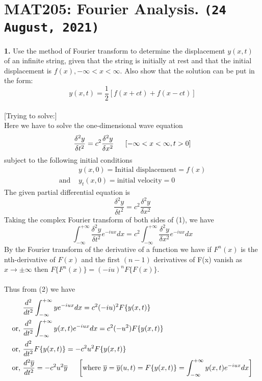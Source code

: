 \documentclass[11pt]{article}
\begin{document}
\section*{MAT205: Fourier Analysis. \texttt{(24 August, 2021)}}
\textbf{1.} Use the method of Fourier transform to determine the displacement $y(x, t)$ of an infinite string, given that the string is initially at rest and that the initial displacement is $f(x), -\infty < x < \infty$. Also show that the solution can be put in the form:
\begin{displaymath}
y(x, t)=\frac{1}{2}\left[f(x+ct)+f(x-ct)\right]
\end{displaymath} \\
\hspace{0cm}
[Trying to solve:]  \\
Here we have to solve the one-dimensional wave equation
$$\frac{\delta^2y}{\delta t^2}=c^2\frac{\delta^2y}{\delta x^2} \hspace{0.5cm}\left[-\infty < x < \infty, t>0\right]$$
subject to the following initial conditions
\begin{align*}
&y(x,0)=\textrm{Initial displacement}=f(x) \\
\textrm{and }&y_t(x,0)=\textrm{initial velocity}=0
\end{align*}
The given partial differential equation is
\begin{equation}
\frac{\delta^2y}{\delta t^2}=c^2\frac{\delta^2y}{\delta x^2}
\end{equation}
Taking the complex Fourier transform of both sides of (1), we have
\begin{equation}
\int_{-\infty}^{+\infty}\frac{\delta^2y}{\delta t^2}e^{-iux} dx=c^2\int_{-\infty}^{+\infty}\frac{\delta^2y}{\delta x^2}e^{-iux} dx
\end{equation}
By the Fourier transform of the derivative of a function we have if $F^n(x)$ is the nth-derivative of $F(x)$ and the first $(n-1)$ derivatives of F(x) vanish as $x \rightarrow \pm \infty$ then $F\{F^n(x)\}=(-iu)^n F\{F(x)\}$. \\\\
Thus from (2) we have
\begin{align*}
&\frac{d^2}{dt^2}\int_{-\infty}^{+\infty}ye^{-iux} dx =c^2(-iu)^2F\{y(x,t)\} \\
\textrm{or, }&\frac{d^2}{dt^2}\int_{-\infty}^{+\infty}y(x,t)e^{-iux} dx =c^2(-u^2) F\{y(x,t)\} \\
\textrm{or, }&\frac{d^2}{dt^2}F\{y(x,t)\} =-c^2u^2 F\{y(x,t)\} \\
\textrm{or, }&\frac{d^2\overline{y}}{dt^2} =-c^2u^2\overline{y} \hspace{0.5cm}\left[\textrm{where }\overline{y}=\overline{y}(u,t)=F\{y(x,t)\}=\int_{-\infty}^{+\infty}y(x,t)e^{-iux} dx\right]
\end{align*}
\end{document}
